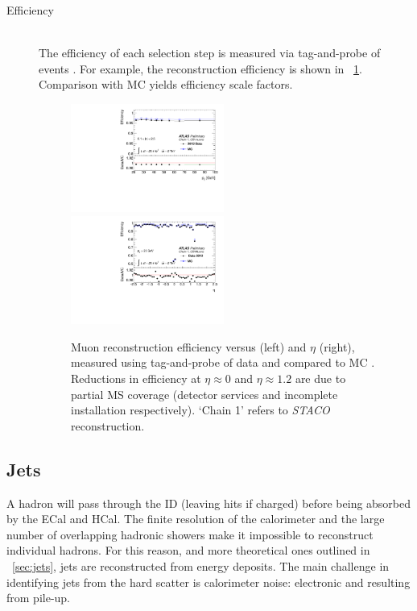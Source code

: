 \begin{description}
\item[Efficiency] \hfill \\
	The efficiency of each selection step is measured via tag-and-probe of 
	\HepProcess{\PZ \HepTo \Pmu\Pmu} events \cite{Muons:2012}. For example, the 
	reconstruction efficiency is shown in \Figure~\ref{fig:objects:mu_recoeff}. 
	Comparison with MC yields efficiency scale factors.

	\begin{figure}
		\includegraphics[width=0.495\textwidth]{tex/selection/mu_recoeff_pt}
		\hfill
		\includegraphics[width=0.495\textwidth]{tex/selection/mu_recoeff_eta}
		\caption{Muon reconstruction efficiency versus \pt (left) and $\eta$ (right), 
		measured using tag-and-probe of \HepProcess{\PZ \HepTo \Pmu\Pmu} data and 
		compared to MC \cite{Muons:2012}. Reductions in efficiency at $\eta \approx 0$ 
		and $\eta \approx 1.2$ are due to partial \ac{MS} coverage (detector services and 
		incomplete installation respectively). `Chain 1' refers to \textit{STACO} 
		reconstruction.}
		\label{fig:objects:mu_recoeff}
	\end{figure}

\end{description}



\subsection{Jets}
\label{sec:objects:jets}

A hadron will pass through the \ac{ID} (leaving hits if charged) before being absorbed by 
the \ac{ECal} and \ac{HCal}. The finite resolution of the calorimeter and the 
large number of overlapping hadronic showers make it impossible to reconstruct individual 
hadrons. For this reason, and more theoretical ones outlined in \Section~\ref{sec:jets}, 
jets are reconstructed from energy deposits. The main challenge in identifying jets from 
the hard scatter is calorimeter noise: electronic and resulting from pile-up.

